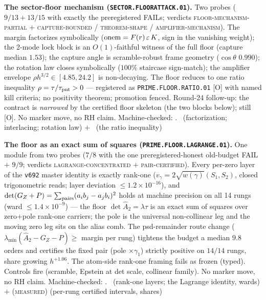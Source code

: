 \documentclass[11pt,a4paper]{article}
\theoremstyle{definition}
\begin{document}
\par\smallskip\noindent\textbf{The sector-floor mechanism
(\texttt{SECTOR.FLOORATTACK.01}).}
Two probes ($9/13+13/15$ with exactly the preregistered FAILs;
verdicts \textsc{floor-mechanism-partial} $+$
\textsc{capture-bounded} / \textsc{theorem-shape} /
\textsc{amplifier-mechanism}).  The margin factorizes symbolically
(${\rm onem}=F(r)\,\varepsilon\,K$, sign in the vanishing weight);
the 2-mode lock block is an $O(1)$-faithful witness of the full
floor (capture median $1.53$); the capture angle is
scramble-robust frame geometry ($\cos\theta$ $0.990$); the
rotation law closes symbolically ($100\%$ staircase sign-match);
the amplifier envelope $\rho h^{3/2}\in[4.85,24.2]$ is
non-decaying.  The floor reduces to one ratio inequality
$\rho=\tau/\tau_{\rm pnt}>0$ --- registered as
\texttt{PRIME.FLOOR.RATIO.01} [O] with named kill criteria; no
positivity theorem; promotion fenced.  Round-24 follow-up: the
contract is \emph{narrowed} by the certified floor skeleton
(the two blocks below); still [O].  No marker move, no RH
claim.
Machine-checked: .
\mE\ (factorization; interlacing; rotation law) $+$ \mO\ (the
ratio inequality)
\par\smallskip

\par\smallskip\noindent\textbf{The floor as an exact sum of
squares (\texttt{PRIME.FLOOR.LAGRANGE.01}).}
One module from two probes ($7/8$ with the one
preregistered-honest old-budget FAIL $+$ $9/9$; verdicts
\textsc{lagrange-concentrated} $+$ \textsc{pair-certified}).
Every per-zero layer of the \texttt{v692} master identity is
exactly rank-one ($v_\gamma=2\sqrt{w(\gamma)}(S_1,S_2)$, closed
trigonometric reads; layer deviation $\le1.2\times10^{-16}$), and
$\det(G_Z+P)=\sum_{\rm pairs}(a_ib_j-a_jb_i)^2$ holds at machine
precision on all 14 rungs (ward $\le1.4\times10^{-9}$) --- the
floor $\det\hat A_2=\lambda\tau$ is an exact sum of squares over
zero$+$pole rank-one carriers; the pole is the universal
non-collinear leg and the moving zero leg sits on the alias comb.
The psd-remainder route change ($\lambda_{\min}(\hat
A_2-G_Z-P)\ge$ margin per rung) tightens the budget a median
$9.8$ orders and certifies the fixed pair (pole
$\times\gamma_1$) strictly positive on $14/14$ rungs, share
growing $h^{+1.06}$.  The atom-side rank-one framing fails as
frozen (typed).  Controls fire (scramble, Epstein at det scale,
collinear family).  No marker move, no RH claim.
Machine-checked: .
\mE\ (rank-one layers; the Lagrange identity, wards) $+$
(\textsc{measured}) (per-rung certified intervals, shares)
\par\smallskip
\end{document}
